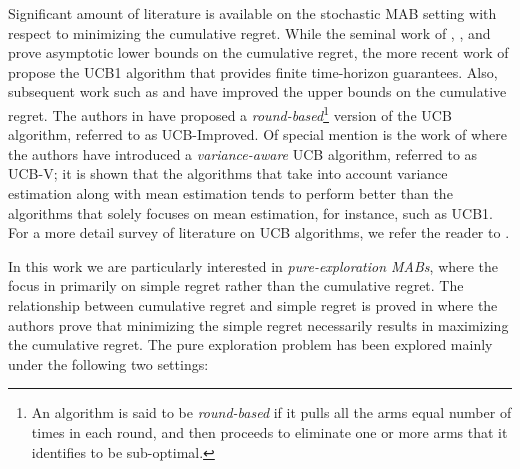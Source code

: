 Significant amount of literature is available on the stochastic MAB setting with respect to minimizing the cumulative regret. While the seminal work of \cite{robbins1952some}, \cite{thompson1933likelihood},  and \cite{lai1985asymptotically} prove asymptotic lower bounds on the cumulative regret, the more recent work of \cite{auer2002finite} propose the UCB1 algorithm that provides finite time-horizon guarantees. Also, subsequent work such as \cite{audibert2009minimax} and \cite{auer2010ucb} have improved the upper bounds on the cumulative regret. The authors in \cite{auer2010ucb} have proposed a \emph{round-based}\footnote{An algorithm is said to be \textit{round-based} if it pulls all the arms equal number of times in each round, and then proceeds to eliminate one or more arms that it identifies to be sub-optimal.} version of the UCB algorithm, referred to as UCB-Improved. Of special mention is the work of \cite{audibert2009exploration} where the authors have introduced a \emph{variance-aware} UCB algorithm, referred to as UCB-V; it is shown that the algorithms that take into account variance estimation along with mean estimation tends to perform better than the algorithms that solely focuses on mean estimation, for instance, such as UCB1.
For a more detail survey of literature on UCB algorithms, we refer the reader to \cite{bubeck2012regret}. 


	

In this work we are particularly interested in \emph{pure-exploration MABs},  where the focus in primarily on simple regret rather than the cumulative regret. The relationship between cumulative regret and simple regret is proved in \cite{bubeck2011pure} where the authors prove that minimizing the simple regret necessarily results in maximizing the cumulative regret.
The pure exploration problem has been explored  mainly under the following two settings:
	
